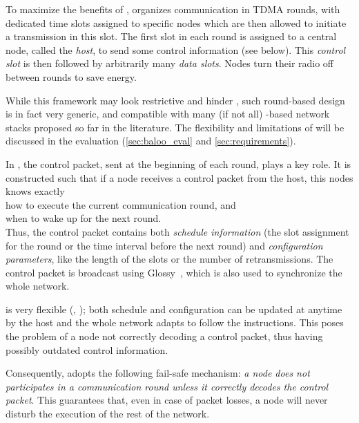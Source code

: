 To maximize the benefits of \ST, \baloo organizes communication in
TDMA rounds, with dedicated time slots assigned to specific nodes which are then allowed to initiate a transmission in this slot.
The first slot in each round is assigned to a central node, called the \textsl{host}, to send some control information (see below). This \textsl{control slot} is then followed by arbitrarily many \textsl{data slots}.
Nodes turn their radio off between rounds to save energy.

While this framework may look restrictive and hinder , such round-based design is in fact very generic, and compatible with many (if not all) \ST-based network stacks proposed so far in the literature. The flexibility and limitations of \baloo will be discussed in the evaluation (\cref{sec:baloo_eval} and \ref{sec:requirements}).

In \baloo, the control packet, sent at the beginning of each round, plays a key role. It is constructed such that if a node receives a control packet from the host, this nodes knows exactly\\
	\inlineitem how to execute the current communication round, and\\
	\inlineitem when to wake up for the next round.\\
Thus, the control packet contains both \textsl{schedule information} (\eg the slot assignment for the round or the time interval before the next round) and \textsl{configuration parameters}, like the length of the slots or the number of retransmissions.
The control packet is broadcast using Glossy~\cite{ferrari2011Glossy}, which is also used to synchronize the whole network.

\baloo is very flexible (, ); both schedule and configuration can be updated at anytime by the host and the whole network adapts to follow the instructions.
This poses the problem of a node not correctly decoding a control packet, thus having possibly outdated control information.

Consequently, \baloo adopts the following fail-safe mechanism: \textsl{a node does not participates in a communication round unless it correctly decodes the control packet}. This guarantees that, even in case of packet losses, a node will never disturb the execution of the rest of the network.

